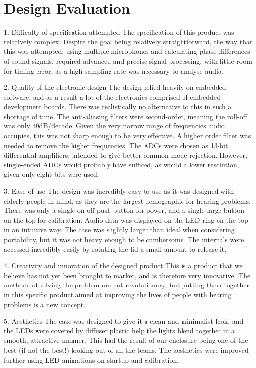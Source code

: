 \documentclass[a4paper]{article}
\begin{document}
\section{Design Evaluation}

1. Difficulty of specification attempted The specification of this product was
relatively complex. Despite the goal being relatively straightforward, the way
that this was attempted, using multiple microphones and calculating phase
differences of sound signals, required advanced and precise signal processing,
with little room for timing error, as a high sampling rate was necessary to
analyse audio.

2. Quality of the electronic design The design relied heavily on embedded
software, and as a result a lot of the electronics comprised of embedded
development boards. There was realistically no alternative to this in such a
shortage of time. The anti-aliasing filters were second-order, meaning the
roll-off was only 40dB/decade. Given the very narrow range of frequencies audio
occupies, this was not sharp enough to be very effective. A higher order filter
was needed to remove the higher frequencies.  The ADCs were chosen as 13-bit
differential amplifiers, intended to give better common-mode rejection. However,
single-ended ADCs would probably have sufficed, as would a lower resolution,
given only eight bits were used.

3. Ease of use The design was incredibly easy to use as it was designed with
elderly people in mind, as they are the largest demographic for hearing
problems. There was only a single on-off push button for power, and a single
large button on the top for calibration. Audio data was displayed on the LED
ring on the top in an intuitive way.  The case was slightly larger than ideal
when considering portability, but it was not heavy enough to be cumbersome.  The
internals were accessed incredibly easily by rotating the lid a small amount to
release it.

4. Creativity and innovation of the designed product This is a product that we
believe has not yet been brought to market, and is therefore very innovative.
The methods of solving the problem are not revolutionary, but putting them
together in this specific product aimed at improving the lives of people with
hearing problems is a new concept.

5. Aesthetics The case was designed to give it a clean and minimalist look, and
the LEDs were covered by diffuser plastic help the lights blend together in a
smooth, attractive manner. This had the result of our enclosure being one of the
best (if not the best!) looking out of all the teams. The aesthetics were
improved further using LED animations on startup and calibration.
\end{document}
